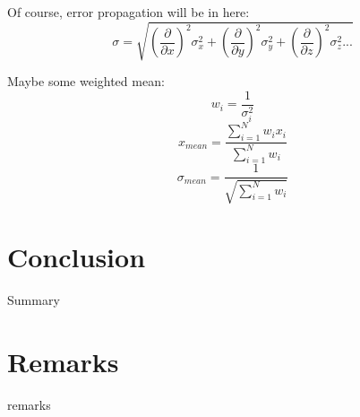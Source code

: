 \documentclass[11pt, oneside]{article}   	%
\begin{document}
Of course, error propagation will be in here:
\begin{equation}  \sigma = \sqrt{\left(\frac{\partial}{\partial x}\right)^2\sigma _x^2+\left(\frac{\partial}{\partial y}\right)^2\sigma _y^2 + \left(\frac{\partial}{\partial z}\right)^2\sigma _z^2...} \end{equation}

Maybe some weighted mean:
\begin{equation} w_i = \frac{1}{\sigma_i^2}  \end{equation}
\begin{equation} x_{mean} = \frac{\sum\limits_{i=1}^N{w_ix_i}}{\sum\limits_{i=1}^N{w_i}} \end{equation}
\begin{equation} \sigma_{mean} = \frac{1}{\sqrt{\sum\limits_{i=1}^N{w_i}}} \end{equation}


\section{Conclusion}
Summary



\section{Remarks}
remarks
\end{document}
